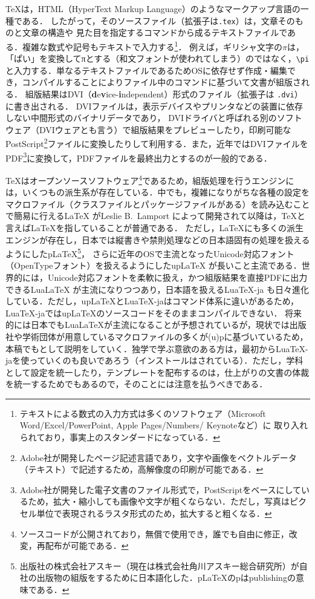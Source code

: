 {\TeX}は，HTML（HyperText Markup Language）のようなマークアップ言語の一種である．
したがって，そのソースファイル（拡張子は\texttt{.tex}）は，文章そのものと文章の構造や
見た目を指定するコマンドから成るテキストファイルである．複雑な数式や記号もテキストで入力する\footnote{テキストによる数式の入力方式は多くのソフトウェア（Microsoft Word/Excel/PowerPoint, Apple Pages/Numbers/ Keynoteなど）に
取り入れられており，事実上のスタンダードになっている．}．
例えば，ギリシャ文字の$\pi$は，「ぱい」を変換してπとする（和文フォントが使われてしまう）のではなく，\verb|\pi|と入力する．単なるテキストファイルであるためOSに依存せず作成・編集でき，コンパイルすることによりファイル中のコマンドに基づいて文書が組版される．
組版結果はDVI（\textbf{\textsf{d}}e\textbf{\textsf{v}}ice-\textbf{\textsf{i}}ndependent）形式のファイル（拡張子は \texttt{.dvi}）に書き出される．
DVIファイルは，表示デバイスやプリンタなどの装置に依存しない中間形式のバイナリデータであり，
DVIドライバと呼ばれる別のソフトウェア（DVIウェアとも言う）で組版結果をプレビューしたり，印刷可能なPostScript\footnote{Adobe社が開発したページ記述言語であり，文字や画像をベクトルデータ（テキスト）で記述するため，高解像度の印刷が可能である．}\cite{PS}ファイルに変換したりして利用する．また，近年ではDVIファイルをPDF\footnote{Adobe社が開発した電子文書のファイル形式で，PostScriptをベースにしているため，拡大・縮小しても画像や文字が粗くならない．ただし，写真はピクセル単位で表現されるラスタ形式のため，拡大すると粗くなる．}に変換して，PDFファイルを最終出力とするのが一般的である．

{\TeX}はオープンソースソフトウェア\footnote{ソースコードが公開されており，無償で使用でき，誰でも自由に修正，改変，再配布が可能である．}であるため，組版処理を行うエンジンには，いくつもの派生系が存在している．中でも，複雑になりがちな各種の設定をマクロファイル（クラスファイルとパッケージファイルがある）を読み込むことで簡易に行える{\LaTeX} \cite{latex}がLeslie B.\ Lamport によって開発されて以降は，{\TeX}と言えば{\LaTeX}を指していることが普通である．
ただし，{\LaTeX}にも多くの派生エンジンが存在し，日本では縦書きや禁則処理などの日本語固有の処理を扱えるようにした{p\LaTeX}\footnote{出版社の株式会社アスキー（現在は株式会社角川アスキー総合研究所）が自社の出版物の組版をするために日本語化した．{p\LaTeX}のpはpublishingの意味である．}\cite{ptex}，
さらに近年のOSで主流となったUnicode対応フォント（OpenTypeフォント）\cite{unicode}\cite{opntyp}を扱えるようにした{up\LaTeX} \cite{uptex}が長いこと主流である．世界的には，Unicode対応フォントを柔軟に扱え，かつ組版結果を直接PDFに出力できる{Lua\LaTeX} \cite{luatex}が主流になりつつあり，日本語を扱える{Lua\TeX-ja} \cite{luatexj}も日々進化している．ただし，{up\LaTeX}と{Lua\TeX-ja}はコマンド体系に違いがあるため，{Lua\TeX-ja}では{up\LaTeX}のソースコードをそのままコンパイルできない．
将来的には日本でも{Lua\LaTeX}が主流になることが予想されているが，現状では出版社や学術団体が用意しているマクロファイルの多くが{(u)p\LaTeXe}に基づいているため，本稿でもとして説明をしていく．独学で学ぶ意欲のある方は，最初から{Lua\TeX-ja}を使っていくのも良いであろう（インストールはされている）．ただし，学科として設定を統一したり，テンプレートを配布するのは，仕上がりの文書の体裁を統一するためでもあるので，そのことには注意を払うべきである．

